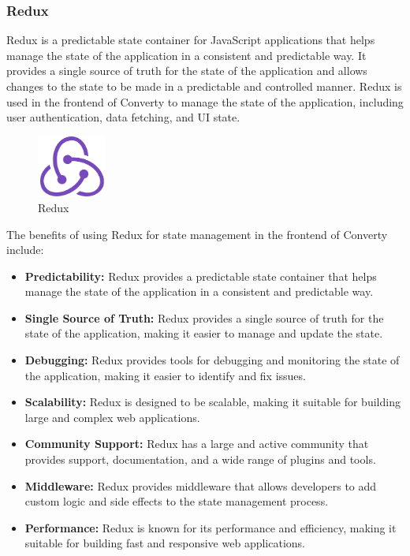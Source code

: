 \subsubsection{Redux}

Redux is a predictable state container for JavaScript applications that helps manage the state of the application in a consistent and predictable way. It provides a single source of truth for the state of the application and allows changes to the state to be made in a predictable and controlled manner. Redux is used in the frontend of Converty to manage the state of the application, including user authentication, data fetching, and UI state.

\begin{figure}[H]
    \centering
    \includegraphics[width=0.2\textwidth]{Images/redux.png}
    \caption{Redux}
    \label{fig:redux}
\end{figure}

The benefits of using Redux for state management in the frontend of Converty include:

\begin{itemize}
    \item \textbf{Predictability:} Redux provides a predictable state container that helps manage the state of the application in a consistent and predictable way.
    \item \textbf{Single Source of Truth:} Redux provides a single source of truth for the state of the application, making it easier to manage and update the state.
    \item \textbf{Debugging:} Redux provides tools for debugging and monitoring the state of the application, making it easier to identify and fix issues.
    \item \textbf{Scalability:} Redux is designed to be scalable, making it suitable for building large and complex web applications.
    \item \textbf{Community Support:} Redux has a large and active community that provides support, documentation, and a wide range of plugins and tools.
    \item \textbf{Middleware:} Redux provides middleware that allows developers to add custom logic and side effects to the state management process.
    \item \textbf{Performance:} Redux is known for its performance and efficiency, making it suitable for building fast and responsive web applications.
\end{itemize}

